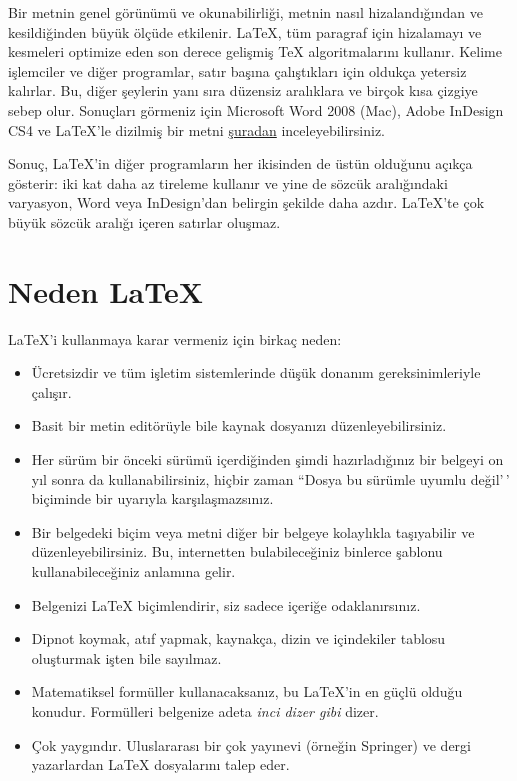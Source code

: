 \documentclass[
  letterpaper,
  DIV=11,
  numbers=noendperiod]{scrreprt}
\begin{document}
Bir metnin genel görünümü ve okunabilirliği, metnin nasıl
hizalandığından ve kesildiğinden büyük ölçüde etkilenir. {\LaTeX}, tüm
paragraf için hizalamayı ve kesmeleri optimize eden son derece gelişmiş
{\TeX} algoritmalarını kullanır. Kelime işlemciler ve diğer programlar,
satır başına çalıştıkları için oldukça yetersiz kalırlar. Bu, diğer
şeylerin yanı sıra düzensiz aralıklara ve birçok kısa çizgiye sebep
olur. Sonuçları görmeniz için Microsoft Word 2008 (Mac), Adobe InDesign
CS4 ve {\LaTeX}'le dizilmiş bir metni
\href{http://www.rtznet.nl/zink/comparison.pdf}{şuradan}
inceleyebilirsiniz.

Sonuç, {\LaTeX}'in diğer programların her ikisinden de üstün olduğunu
açıkça gösterir: iki kat daha az tireleme kullanır ve yine de sözcük
aralığındaki varyasyon, Word veya InDesign'dan belirgin şekilde daha
azdır. {\LaTeX}'te çok büyük sözcük aralığı içeren satırlar oluşmaz.

\hypertarget{neden-latex}{%
\section{\texorpdfstring{Neden {\LaTeX}}{Neden }}\label{neden-latex}}

{\LaTeX}'i kullanmaya karar vermeniz için birkaç neden:

\begin{itemize}
\item
  Ücretsizdir ve tüm işletim sistemlerinde düşük donanım
  gereksinimleriyle çalışır.
\item
  Basit bir metin editörüyle bile kaynak dosyanızı düzenleyebilirsiniz.
\item
  Her sürüm bir önceki sürümü içerdiğinden şimdi hazırladığınız bir
  belgeyi on yıl sonra da kullanabilirsiniz, hiçbir zaman ``Dosya bu
  sürümle uyumlu değil'\,' biçiminde bir uyarıyla karşılaşmazsınız.
\item
  Bir belgedeki biçim veya metni diğer bir belgeye kolaylıkla
  taşıyabilir ve düzenleyebilirsiniz. Bu, internetten bulabileceğiniz
  binlerce şablonu kullanabileceğiniz anlamına gelir.
\item
  Belgenizi {\LaTeX} biçimlendirir, siz sadece içeriğe odaklanırsınız.
\item
  Dipnot koymak, atıf yapmak, kaynakça, dizin ve içindekiler tablosu
  oluşturmak işten bile sayılmaz.
\item
  Matematiksel formüller kullanacaksanız, bu {\LaTeX}'in en güçlü olduğu
  konudur. Formülleri belgenize adeta \emph{inci dizer gibi} dizer.
\item
  Çok yaygındır. Uluslararası bir çok yayınevi (örneğin Springer) ve
  dergi yazarlardan {\LaTeX} dosyalarını talep eder.
\end{itemize}
\end{document}

